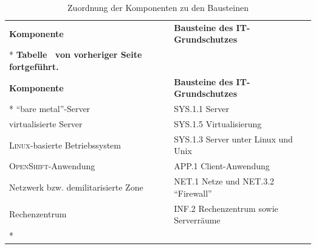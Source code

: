 \begin{longtable}{@{}lp{8.0cm}@{}}
	\toprule[1.5pt]
	\textbf{Komponente} & \textbf{Bausteine des IT-Grundschutzes} \\* \midrule
	\endfirsthead
	\multicolumn{2}{c}%
	{{\bfseries Tabelle \thetable\ von vorheriger Seite fortgeführt.}} \\
	\toprule
	\textbf{Komponente} & \textbf{Bausteine des IT-Grundschutzes} \\* \midrule
	\endhead
	\bottomrule
	\endfoot
	\endlastfoot
	\enquote{bare metal}-Server & SYS.1.1 Server\\
	virtualisierte Server & SYS.1.5 Virtualisierung \\
	\textsc{Linux}-basierte Betriebssystem & SYS.1.3 Server unter Linux und Unix\\
	\textsc{OpenShift}-Anwendung & APP.1 Client-Anwendung\\
	\pagebreak
	Netzwerk bzw. demilitarisierte Zone & NET.1 Netze und NET.3.2 \enquote{Firewall}\\
	Rechenzentrum & INF.2 Rechenzentrum sowie Serverräume\\* 
	
	\bottomrule[1.5pt]
	
	\caption{Zuordnung der Komponenten zu den Bausteinen}\label{tab:zuordnungKompBau}\\
\end{longtable}

